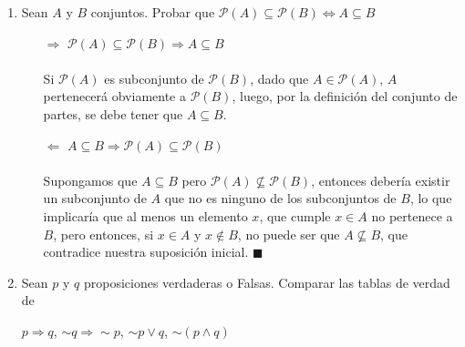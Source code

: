 \documentclass[a4paper,11pt]{article}
\newcommand{\partesde}[1][*]{
    \mathcal{P}({#1})
}
\begin{document}
\begin{enumerate}
\begin{enumerate}[label = \roman*)]
\begin{minipage}[c]{0.8\linewidth}
            \end{minipage}
        \end{enumerate}
        \item Sean $A$ y $B$ conjuntos. Probar que $\mathcal{P}(A)\subseteq \mathcal{P}(B)\Leftrightarrow A \subseteq B$
        \begin{itemize}
            \item[$\Rightarrow$] $\mathcal{P}(A)\subseteq \mathcal{P}(B)\Rightarrow A \subseteq B$\\\\
            Si $\partesde[A]$ es subconjunto de $\partesde[B]$, dado que $A\in\partesde[A]$, $A$ pertenecerá obviamente a $\partesde[B]$, luego, por la definición del conjunto de partes, se debe tener que $A\subseteq B$.\\
            \item[$\Leftarrow$] $A \subseteq B \Rightarrow \mathcal{P}(A)\subseteq \mathcal{P}(B) $\\\\
            Supongamos que  $A\subseteq B$ pero $\partesde[A] \not\subseteq \partesde[B]$, entonces debería existir un subconjunto de $A$ que no es ninguno de los subconjuntos de $B$, lo que implicaría que al menos un elemento $x$, que cumple $x\in A$ no pertenece a $B$, pero entonces, si $x\in A$ y $x\not\in B$, no puede ser que $A\not\subseteq B$, que contradice nuestra suposición inicial. $\blacksquare$
        \end{itemize}
        \item Sean $p$ y $q$ proposiciones verdaderas o Falsas. Comparar las tablas de verdad de
        \begin{center}
            $p\Rightarrow q$, \hspace*{12pt} $\sim q \Rightarrow \sim p $, \hspace*{12pt} $\sim p \vee q$, \hspace*{12pt} $\sim(p\wedge q)$\\\vspace{12pt}
            

\end{center}
\end{enumerate}
\end{document}
